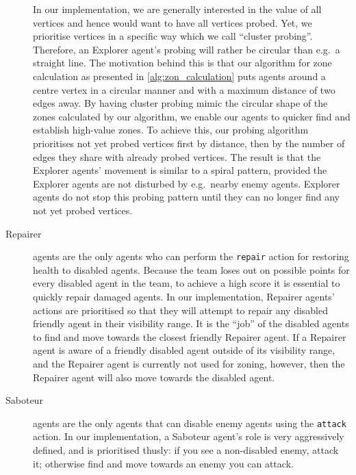\begin{description}
        In our implementation, we are generally interested in the value of all vertices and hence would want to have all vertices probed.
        Yet, we prioritise vertices in a specific way which we call \enquote{cluster probing}.
        Therefore, an Explorer agent's probing will rather be circular than e.g.\ a straight line.
        The motivation behind this is that our algorithm for zone calculation as presented in \autoref{alg:zon_calculation} puts agents around a centre vertex in a circular manner and with a maximum distance of two edges away.
        By having cluster probing mimic the circular shape of the zones calculated by our algorithm, we enable our agents to quicker find and establish high-value zones.
        To achieve this, our probing algorithm prioritises not yet probed vertices first by distance, then by the number of edges they share with already probed vertices.
        The result is that the Explorer agents' movement is similar to a spiral pattern, provided the Explorer agents are not disturbed by e.g.\ nearby enemy agents.
        Explorer agents do not stop this probing pattern until they can no longer find any not yet probed vertices.
    \item[Repairer] agents are the only agents who can perform the \texttt{repair} action for restoring health to disabled agents.
        Because the team loses out on possible points for every disabled agent in the team, to achieve a high score it is essential to quickly repair damaged agents.
        In our implementation, Repairer agents' actions are prioritised so that they will attempt to repair any disabled friendly agent in their visibility range.
        It is the \enquote{job} of the disabled agents to find and move towards the closest friendly Repairer agent.
        If a Repairer agent is aware of a friendly disabled agent outside of its visibility range, and the Repairer agent is currently not used for zoning, however, then the Repairer agent will also move towards the disabled agent.
    \item[Saboteur] agents are the only agents that can disable enemy agents using the \texttt{attack} action.
        In our implementation, a Saboteur agent's role is very aggressively defined, and is prioritised thusly: if you see a non-disabled enemy, attack it; otherwise find and move towards an enemy you can attack.


\end{description}

